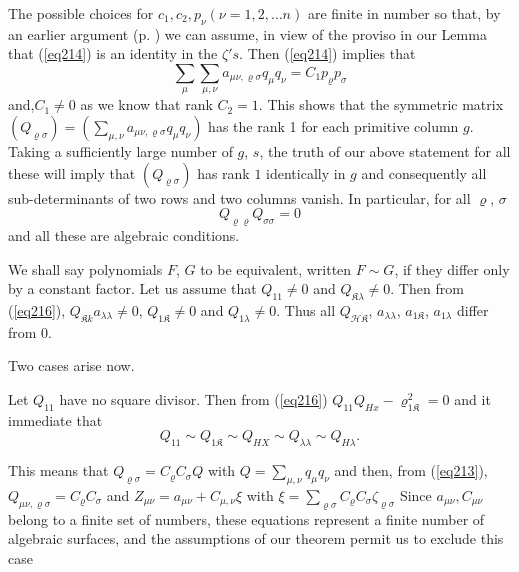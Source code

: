  The possible choices for $c_1, c_2, p_\nu (\nu = 1, 2, \ldots n)$
 are finite in number so that, by 
 an earlier argument (p. \pageref{p165}) we can assume, in view of the proviso
 in our Lemma that (\ref{eq214}) is an identity in the $\zeta's$. Then
 (\ref{eq214}) implies that 
 \begin{equation*}
\sum_{\mu} \sum_{\mu, \nu} a_{\mu \nu, \varrho \sigma} q_{\mu} q_{\nu}
= C_1 p_{\varrho} p_{\sigma} \tag{215}\label{eq215}  
 \end{equation*}
 and,\pageoriginale $C_1 \neq 0$ as we know that rank $C_2 =1$. This
 shows that the 
 symmetric matrix $(Q_{\varrho \sigma}) = ( \sum _{\mu , \nu} a_{\mu
   \nu, \varrho \sigma} q_{\mu} q_{\nu})$ has the rank 1 for each
 primitive column $g$. Taking a sufficiently large number of $g$, $s$,
 the truth of our above statement for all these will imply that
 $(Q_{\varrho \sigma})$ has rank $1$ identically in $g$ and
 consequently all sub-determinants of two rows and two columns
 vanish. In particular, for all $\varrho$, $\sigma$ 
 \begin{equation*}
Q_{\varrho \varrho} Q_{\sigma \sigma} = 0 \tag{216}\label{eq216} 
  \end{equation*}  
  and all  these are algebraic conditions.
  
  We shall say polynomials $F$, $G$ to be equivalent, written $ F \sim
  G$, if they differ only by a constant factor. Let  us  assume that
  $Q_{11} \neq 0$ and $Q_{\mathfrak{K} \lambda} \neq 0$. Then from (\ref{eq216}),
  $Q_{\mathfrak{K}k} a_{\lambda \lambda} \neq 0$, $Q_{1 \mathfrak{K}}
  \neq 0$ and $Q_{1 
    \lambda} \neq 0$. Thus all $Q_{\mathscr{H}\mathfrak{K}}$, $a_{\lambda \lambda}$,
  $a_{1 \mathfrak{K}}$, $a_{1 \lambda}$ differ from 0. 
  
  Two  cases arise now.
  
\medskip
{}
Let $Q_{11}$ have no square divisor. Then from (\ref{eq216}) $Q_{11} Q_{H
  x}- \varrho^2 _{1\mathfrak{K}}=0$ and it immediate that 
$$
Q_{11} \sim Q_{1\mathfrak{K}} \sim Q_{H X} \sim Q_{\lambda \lambda} \sim Q_{H
  \lambda}. 
$$

This means that $Q_{\varrho \sigma} = C_{\varrho} C_{\sigma} Q$ with
$Q = \sum_{\mu , \nu} q_\mu q_{\nu}$ and then, from (\ref{eq213}), $Q_{\mu
  \nu, \varrho \sigma} = C_{\varrho} C_{\sigma}$ and $Z_{\mu \nu} =
a_{\mu \nu} + C_{\mu, \nu} \xi$ with $\xi = \sum_{\varrho \sigma}
C_{\varrho} C_{\sigma} \zeta_{\varrho \sigma}$ Since $a_{\mu \nu},
C_{\mu \nu}$ belong to a finite set of numbers, these equations
represent a finite number of algebraic surfaces, and the assumptions
of our theorem permit us to exclude this case 

